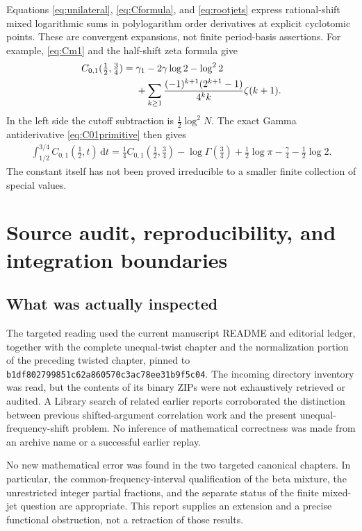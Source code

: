 \documentclass[11pt,a4paper]{article}
\numberwithin{equation}{section}
\theoremstyle{definition}\newtheorem{definition}[theorem]{Definition}
\theoremstyle{remark}\newtheorem{remark}[theorem]{Remark}
\newcommand{\dd}{\,\mathrm d}
\newcommand{\pin}{\texttt{b1df802799851c62a860570c3ac78ee31b9f5c04}}
\begin{document}
Equations \eqref{eq:unilateral}, \eqref{eq:Cformula}, and
\eqref{eq:rootjets} express rational-shift mixed logarithmic sums in
polylogarithm order derivatives at explicit cyclotomic points. These
are convergent expansions, not finite period-basis assertions.
For example, \eqref{eq:Cm1} and the half-shift zeta formula give
\begin{align}
 C_{0,1}(\tfrac12,\tfrac34)
 ={}&\gamma_1-2\gamma\log2-\log^22\notag\\
 &+\sum_{k\ge1}\frac{(-1)^{k+1}(2^{k+1}-1)}{4^k k}\zeta(k+1).
 \label{eq:scalarquarter}
\end{align}
In the left side the cutoff subtraction is $\tfrac12\log^2N$.
The exact Gamma antiderivative \eqref{eq:C01primitive} then gives
\begin{align}
 \int_{1/2}^{3/4}C_{0,1}(\tfrac12,t)\dd t
  =\frac14C_{0,1}(\tfrac12,\tfrac34)
      -\log\Gamma(\tfrac34)+\tfrac12\log\pi
                           -\frac\gamma4-\frac12\log2.
 \label{eq:scalarquarterprimitive}
\end{align}
The constant itself has not been proved irreducible to a smaller
finite collection of special values.

\section{Source audit, reproducibility, and integration boundaries}
\label{sec:audit}
\subsection{What was actually inspected}
The targeted reading used the current manuscript README and editorial
ledger, together with the complete unequal-twist chapter and the
normalization portion of the preceding twisted chapter, pinned to
\pin. The incoming directory inventory was read, but the contents of
its binary ZIPs were not exhaustively retrieved or audited. A Library
search of related earlier reports corroborated the distinction between
previous shifted-argument correlation work and the present
unequal-frequency-shift problem. No inference of mathematical correctness
was made from an archive name or a successful earlier replay.

No new mathematical error was found in the two targeted canonical
chapters. In particular, the common-frequency-interval qualification of
the beta mixture, the unrestricted integer partial fractions, and the
separate status of the finite mixed-jet question are appropriate.
This report supplies an extension and a precise functional obstruction,
not a retraction of those results.
\end{document}
